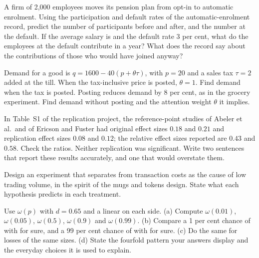 \begin{exercise}[$\star\star$]\label{exo:b2:behavioural-evidence:6}
A firm of 2,000 employees moves its pension plan from opt-in to automatic enrolment. Using the
participation and default rates of the automatic-enrolment record, predict the number of participants
before and after, and the number at the default. If the average salary is  and the default
rate 3 per cent, what do the employees at the default contribute in a year? What does the record say
about the contributions of those who would have joined anyway?
\end{exercise}

\begin{exercise}[$\star\star$]\label{exo:b2:behavioural-evidence:7}
Demand for a good is $q = 1600 - 40(p + \theta\tau)$, with $p = 20$ and a sales tax $\tau = 2$ added at
the till. When the tax-inclusive price is posted, $\theta = 1$. Find demand when the tax is posted.
Posting reduces demand by 8 per cent, as in the grocery experiment. Find demand without posting and the
attention weight $\theta$ it implies.
\end{exercise}

\begin{exercise}[$\star\star$]\label{exo:b2:behavioural-evidence:8}
In Table~S1 of the replication project, the reference-point studies of Abeler et al.\ and of Ericson and
Fuster had original effect sizes $0.18$ and $0.21$ and replication effect sizes $0.08$ and $0.12$; the
relative effect sizes reported are $0.43$ and $0.58$. Check the ratios. Neither replication was
significant. Write two sentences that report these results accurately, and one that would overstate them.
\end{exercise}

\begin{exercise}[$\star\star$]\label{exo:b2:behavioural-evidence:9}
Design an experiment that separates  from transaction costs as the cause of low trading
volume, in the spirit of the mugs and tokens design. State what each hypothesis predicts in each
treatment.
\end{exercise}

\begin{exercise}[$\star\star\star$]\label{exo:b2:behavioural-evidence:10}
Use $\omega(p)$ with $d = 0.65$ and a  linear on each side. (a) Compute $\omega(0.01)$,
$\omega(0.05)$, $\omega(0.5)$, $\omega(0.9)$ and $\omega(0.99)$. (b) Compare a 1 per cent chance of
 with  for sure, and a 99 per cent chance of  with  for sure. (c) Do
the same for losses of the same sizes. (d) State the fourfold pattern your answers display and the
everyday choices it is used to explain.
\end{exercise}

